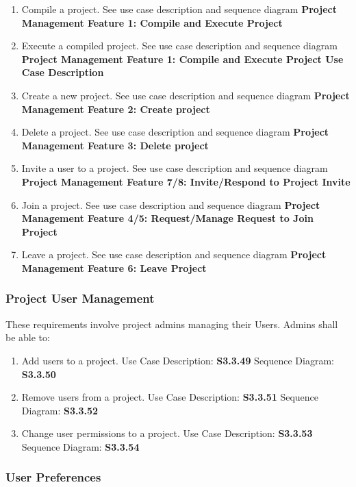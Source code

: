 \documentclass[twoside,letterpaper]{article}
\begin{document}
{\begin{enumerate}
	\item Compile a project.  See use case description and sequence diagram \textbf{Project Management Feature 1: Compile and Execute Project}
	\item Execute a compiled project. See use case description and sequence diagram \textbf{Project Management Feature 1: Compile and Execute Project Use Case Description}
	\item Create a new project. See use case description and sequence diagram \textbf{Project Management Feature 2: Create project}
	\item Delete a project. See use case description and sequence diagram \textbf{Project Management Feature 3: Delete project}
	\item Invite a user to a project. See use case description and sequence diagram \textbf{Project Management Feature 7/8: Invite/Respond to Project Invite}
	\item Join a project. See use case description and sequence diagram \textbf{Project Management Feature 4/5: Request/Manage Request to Join Project}
	\item Leave a project. See use case description and sequence diagram \textbf{Project Management Feature 6: Leave Project}
\end{enumerate}

\subsubsection{Project User Management}

These requirements involve project admins managing their Users. Admins shall be able to:

\begin{enumerate}
	\item Add users to a project.
    \subitem Use Case Description: \textbf{S3.3.49}
		\subitem Sequence Diagram: \textbf{S3.3.50}
  \item Remove users from a project.
    \subitem Use Case Description: \textbf{S3.3.51}
		\subitem Sequence Diagram: \textbf{S3.3.52}
	\item Change user permissions to a project.
    \subitem Use Case Description: \textbf{S3.3.53}
		\subitem Sequence Diagram: \textbf{S3.3.54}
\end{enumerate}

\subsubsection{User Preferences}

}
\end{document}
